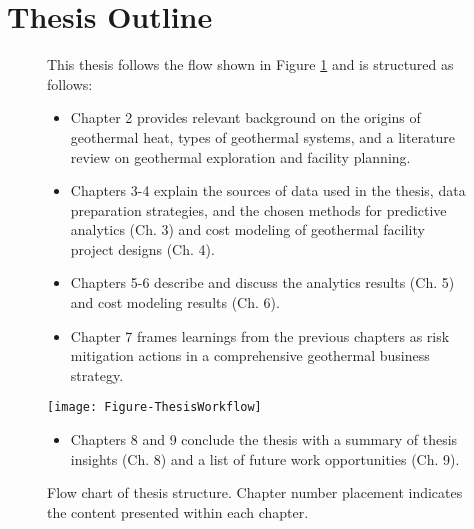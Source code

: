 \section{Thesis Outline}\label{ch1:outline}

\begin{figure}[!htp]
\onehalfspacing
\begin{minipage}[b]{0.53\textwidth}
This thesis follows the flow shown in Figure \ref{fig:thesis_flow} and is structured as follows: 
\begin{itemize}
\item Chapter 2 provides relevant background on the origins of geothermal heat, types of geothermal systems, and a literature review on geothermal exploration and facility planning.
\item Chapters 3-4 explain the sources of data used in the thesis, data preparation strategies, and the chosen methods for predictive analytics (Ch. 3) and cost modeling of geothermal facility project designs (Ch. 4).
\item Chapters 5-6 describe and discuss the analytics results (Ch. 5) and cost modeling results (Ch. 6).
\item Chapter 7 frames learnings from the previous chapters as risk mitigation actions in a comprehensive geothermal business strategy.
\end{itemize}
\end{minipage} \hfill
\begin{minipage}[b]{0.44\textwidth}
\texttt{[image: Figure-ThesisWorkflow]}
\caption[Flow chart for thesis structure]{Flow chart of thesis structure. Chapter number placement indicates the content presented within each chapter.}
\label{fig:thesis_flow}
\end{minipage}
\begin{itemize}
\item Chapters 8 and 9 conclude the thesis with a summary of thesis insights (Ch. 8) and a list of future work opportunities (Ch. 9).
\end{itemize}
\end{figure}

